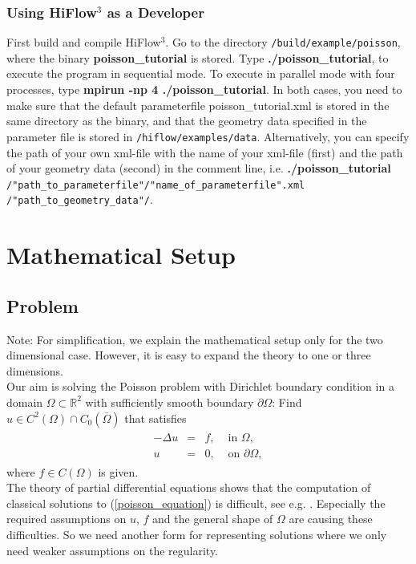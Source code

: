 \documentclass[a4paper, 11pt, twoside]{article}
\begin{document}
\subsubsection{Using HiFlow$^3$ as a Developer}\label{sectiondeveloper}
First build and compile HiFlow$^3$. Go to the directory \verb'/build/example/poisson', where the binary \textbf{poisson\_tutorial} is stored. Type \textbf{./poisson\_tutorial}, to execute the program in sequential mode. To execute in parallel mode  with four processes, type \textbf{mpirun -np 4 ./poisson\_tutorial}. In both cases, you need to make sure that the default parameterfile poisson\_tutorial.xml is stored in the same directory as the binary, and that the geometry data specified in the parameter file is stored in \verb'/hiflow/examples/data'. Alternatively, you can specify the path of your own xml-file with the name of your xml-file (first) and the path of your geometry data (second) in the comment line, i.e. \textbf{./poisson\_tutorial} \verb'/"path_to_parameterfile"/"name_of_parameterfile".xml' \verb'/"path_to_geometry_data"/'.


\section{Mathematical Setup}
\subsection{Problem}
Note: For simplification, we explain the mathematical setup only for the two dimensional case. However, it is easy to expand the theory to one or three dimensions. \\
Our aim is solving the Poisson problem with Dirichlet boundary condition in a domain $\Omega \subset \mathbb{R}^2$ with sufficiently smooth boundary $\partial \Omega$: Find $u\in C^2(\Omega) \cap C_0(\overline{\Omega})$ that satisfies
\begin{eqnarray}\label{poisson_equation}
\begin{array}{rcll}
-\Delta u &=& f, & \text{ in }\Omega,\\
        u &=& 0, & \text{ on }\partial\Omega,
\end{array}
\end{eqnarray}
where $f \in C(\Omega)$ is given. \\

The theory of partial differential equations shows that the computation of classical solutions to (\ref{poisson_equation}) is difficult, see e.g. \cite{evans}. Especially the required assumptions on $u$, $f$ and the general shape of $\Omega$ are causing these difficulties. So we need another form for representing solutions where we only need weaker assumptions on the regularity.
\end{document}
